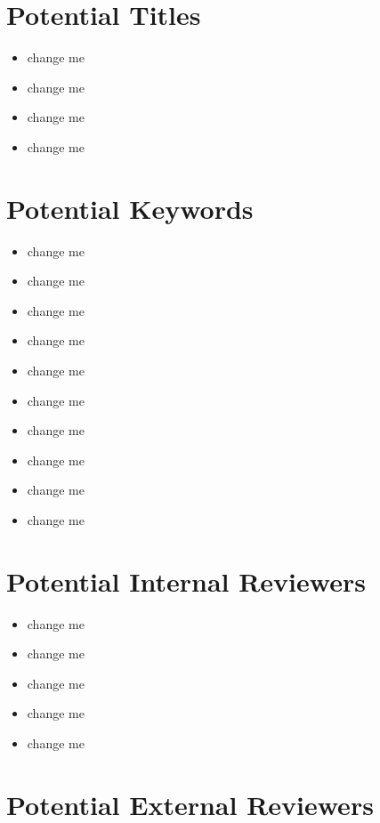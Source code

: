 \documentclass[10pt,letterpaper]{article}
\begin{document}
\section{Potential Titles}
  \begin{itemize}
  \item change me
  \item change me
  \item change me
  \item change me
\end{itemize}

\section{Potential Keywords}


\begin{itemize}
  \item change me
  \item change me
  \item change me
  \item change me
  \item change me
  \item change me
  \item change me
  \item change me
  \item change me
  \item change me
\end{itemize}


\section{Potential Internal Reviewers}

\begin{itemize}
  \item change me
  \item change me
  \item change me
  \item change me
  \item change me
\end{itemize}


\section{Potential External Reviewers}
\end{document}
